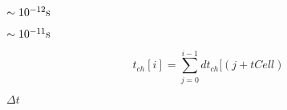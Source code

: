 \documentclass{article}
\begin{document}
$\sim 10^{-12}\textup{s}$
\pagebreak

$\sim 10^{-11}\textup{s}$
\pagebreak

\[
   t_{ch}[i] = \sum_{j = 0}^{i - 1} dt_{ch}[(j + tCell)%
\]
\pagebreak

$ \Delta t$
\pagebreak
\end{document}

